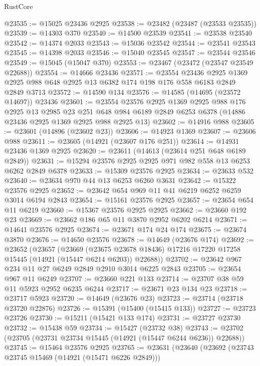 \begin{lexlean}{RustCore}
\begin{coremodule}
@23535 := @15025 @23436 @2925
@23538 := @23482 (@23487 (@23533 @23535))
@23539 := @14303 @370
@23540 := @14500 @23539
@23541 := @23538 @23540
@23542 := @14374 @2033
@23543 := @15036 @23542
@23544 := @23541 @23543
@23545 := @14398 @2033
@23546 := @15040 @23545
@23547 := @23544 @23546
@23549 := @15045 (@15047 @370)
@23553 := @23467 (@23472 (@23547 @23549 @22688))
@23554 := @14666 @23436
@23571 := @23554
    @23436
    @2925
    @1369
    @2925
    @988
    @648
    @2925
    @13
    @6382
    @174
    @198
    @176
    @558
    @6183
    @2849
    @2849
    @3713
@23572 := @14590 @134
@23576 := @14585 (@14695 (@23572 @14697)) @23436
@23601 := @23554
    @23576
    @2925
    @1369
    @2925
    @988
    @176
    @2925
    @13
    @2985
    @23
    @251
    @648
    @984
    @6189
    @2849
    @6253
    @6378
    (@14886 @23436 @2925 @1369 @2925 @988 @2925 @13)
@23602 := @14916 @988
@23605 := @23601 (@14896 (@23602 @23))
@23606 := @14923 @1369
@23607 := @23606 @988
@23611 := @23605 (@14921 (@23607 @176 @251))
@23614 := @14931 @23436 @1369 @2925
@23620 := @23611 (@14613 (@23614 @251 @648 @6189 @2849))
@23631 := @15294 @23576 @2925 @2925 @971 @982 @558 @13 @6253 @6262 @2849 @6378
@23633 := @15309 @23576 @2925
@23634 := @23633 @532
@23640 := @23634 @970 @44 @13 @6253 @6260 @3631
@23642 := @15322 @23576 @2925
@23652 := @23642 @654 @969 @11 @41 @6219 @6252 @6259 @3014 @6194 @2843
@23654 := @15161 @23576 @2925
@23657 := @23654 @654 @11 @6219
@23660 := @15367 @23576 @2925 @2925
@23662 := @23660 @192 @23
@23669 := @23662 @186 @65 @11 @3870 @2952 @6202 @6214
@23671 := @14641 @23576 @2925
@23674 := @23671 @174 @24 @174
@23675 := @23674 @3870
@23676 := @14650 @23576
@23678 := @14649 (@23676 @174)
@23692 := @23652
    (@23657
      (@23669
        (@23675 @23678 @18436)
        @17216
        @17220
        @17258
        @15445
        (@14921 (@15447 @6214 @6203))
        @22688))
@23702 := @23642 @967 @234 @11 @27 @6249 @2849 @2910 @3014 @6225 @2843
@23705 := @23654 @967 @11 @6249
@23707 := @23660 @221 @133
@23714 := @23707 @38 @59 @11 @5923 @2952 @6235 @6244
@23717 := @23671 @23 @134 @23
@23718 := @23717 @5923
@23720 := @14649 (@23676 @23)
@23723 := @23714 (@23718 @23720 @22876)
@23726 := @15391 (@15400 (@15415 @133))
@23727 := @23723 @23726
@23730 := @15211 (@15421 @133 @174)
@23731 := @23727 @23730
@23732 := @15438 @59
@23734 := @15427 (@23732 @38)
@23743 := @23702 (@23705 (@23731 @23734 @15445 (@14921 (@15447 @6244 @6236)) @22688))
@23745 := @15464 @23576 @2925
@23765 := @23631
    (@23640
      (@23692
        (@23743 @23745 @15469 (@14921 (@15471 @6226 @2849)))

\end{coremodule}
\end{lexlean}
